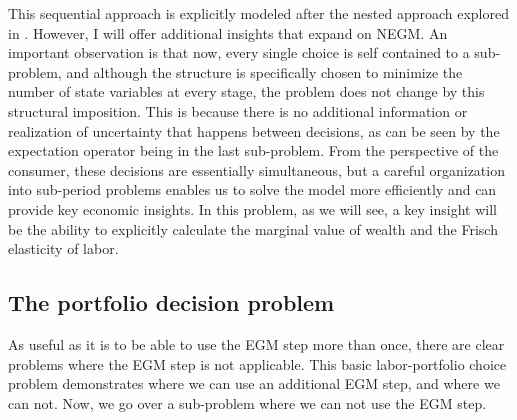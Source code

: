 \documentclass[\econtexRoot/SequentialEGM]{subfiles}
\begin{document}
This sequential approach is explicitly modeled after the nested approach explored in \cite{Druedahl2021-wl}. However, I will offer additional insights that expand on NEGM. An important observation is that now, every single choice is self contained to a sub-problem, and although the structure is specifically chosen to minimize the number of state variables at every stage, the problem does not change by this structural imposition. This is because there is no additional information or realization of uncertainty that happens between decisions, as can be seen by the expectation operator being in the last sub-problem. From the perspective of the consumer, these decisions are essentially simultaneous, but a careful organization into sub-period problems enables us to solve the model more efficiently and can provide key economic insights. In this problem, as we will see, a key insight will be the ability to explicitly calculate the marginal value of wealth and the Frisch elasticity of labor.

%



\subsection{The portfolio decision problem}

As useful as it is to be able to use the EGM step more than once, there are clear problems where the EGM step is not applicable. This basic labor-portfolio choice problem demonstrates where we can use an additional EGM step, and where we can not. Now, we go over a sub-problem where we can not use the EGM step.
\end{document}
